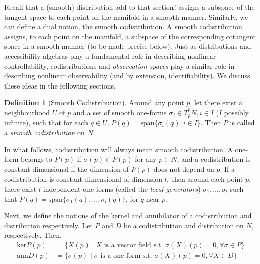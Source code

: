 \documentclass[psamsfonts]{amsart}
\theoremstyle{definition}
\newtheorem{defn}[thm]{Definition}
\theoremstyle{remark}
\numberwithin{equation}{section}
\begin{document}

Recall that a (smooth) distribution {\color{red}add to that section!} assigns a subspace of the tangent space to each point on the manifold in a smooth manner. Similarly, we can define a dual notion, the smooth codistribution. A smooth codistribution assigns, to each point on the manifold, a subspace of the corresponding cotangent space in a smooth manner (to be made precise below). Just as distributions and accessibility algebras play a fundamental role in describing nonlinear controllability, codistributions and \textit{observation spaces} play a similar role in describing nonlinear observability (and by extension, identifiability). We discuss these ideas in the following sections. 

\begin{defn}[Smooth Codistribution]
Around any point $p$, let there exist a neighbourhood $U$ of $p$ and a set of smooth one-forms $\sigma_i \in T^*_pN, i\in I$ ($I$ possibly infinite), such that for each $q \in U$, $P(q) = \text{span}\{\sigma_i(q); i \in I\}$. Then $P$ is called a \textit{smooth codistribution }on $N$. 
\end{defn}

In what follows, codistribution will always mean smooth codistribution. A one-form belongs to $P(p)$ if $\sigma(p) \in P(p)$ for any $p\in N$, and a codistribution is constant dimensional if the dimension of $P(p)$ does not depend on $p$. If a codistribution is constant dimensional of dimension $l$, then around each point $p$, there exist $l$ independent one-forms (called the \textit{local generators}) $\sigma_1, \dots, \sigma_l$ such that $P(q) = \text{span}\{\sigma_1(q), \dots, \sigma_l(q)\}$, for $q$ near $p$. 

Next, we define the notions of the kernel and annihilator of a codistribution and distribution respectively. Let $P$ and $D$ be a codistribution and distribution on $N$, respectively. Then, 
\begin{equation}
    \begin{aligned}
        \text{ker}P(p) &={} \{X(p) \mid X \text{ is a vector field s.t. } \sigma(X)(p) = 0, \forall \sigma \in P\}\\
        \text{ann}D(p) &={} \{\sigma(p) \mid \sigma \text{ is a one-form s.t. } \sigma(X)(p) = 0, \forall X \in D\}
    \end{aligned}   
\end{equation}
\end{document}
